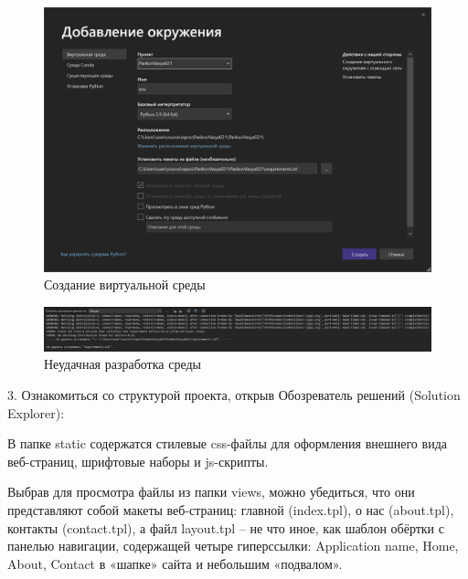 \documentclass[14pt]{extarticle}
\begin{document}
\begin{figure}[H]
\centering
\includegraphics[width=.9\linewidth]{images/20230323-120529_screenshot.png}
\caption{Создание виртуальной среды}
\end{figure}

\begin{figure}[H]
\centering
\includegraphics[width=.9\linewidth]{images/20230323-121117_screenshot.png}
\caption{Неудачная разработка среды}
\end{figure}



​3. Ознакомиться со структурой проекта, открыв Обозреватель решений (Solution Explorer): 

В папке static содержатся стилевые css-файлы для оформления внешнего вида веб-страниц, шрифтовые наборы и js-скрипты. 

Выбрав для просмотра файлы из папки views, можно убедиться, что они представляют собой макеты веб-страниц: главной (index.tpl), о нас (about.tpl), контакты (contact.tpl),
а файл layout.tpl – не что иное, как шаблон обёртки с панелью навигации, содержащей четыре гиперссылки: Application name, Home, About, Contact в «шапке» сайта и небольшим «подвалом».
\end{document}
